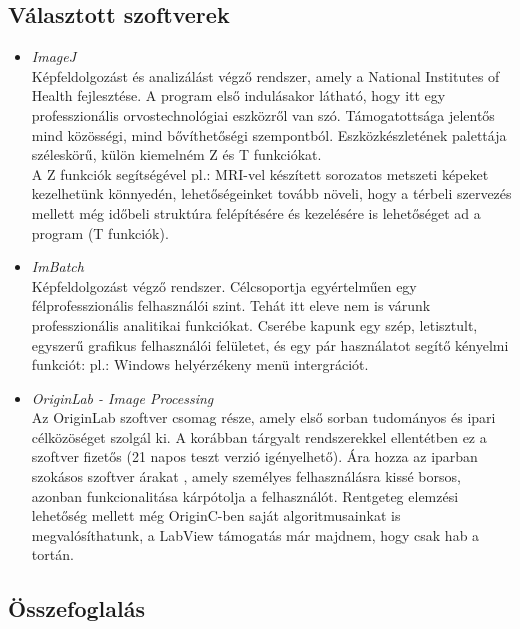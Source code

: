 \documentclass[a4paper,12pt,oneside]{report}
\begin{document}
\subsection{Választott szoftverek}
\begin{itemize}

    \item \emph{ImageJ}\cite{website:imagej}\\
    Képfeldolgozást és analizálást végző rendszer, amely a National Institutes of Health fejlesztése.
	A program első indulásakor látható, hogy itt egy professzionális orvostechnológiai eszközről van szó.
	Támogatottsága jelentős mind közösségi, mind bővíthetőségi szempontból. Eszközkészletének palettája széleskörű, külön kiemelném Z és T funkciókat.\cite{article:imagej_article}\\A Z funkciók segítségével pl.: MRI-vel készített sorozatos metszeti képeket kezelhetünk könnyedén, lehetőségeinket tovább növeli, hogy a térbeli szervezés mellett még időbeli struktúra felépítésére és kezelésére is lehetőséget ad a program (T funkciók).
    
    \item \emph{ImBatch}\cite{website:imbatch}\\
    Képfeldolgozást végző rendszer. Célcsoportja egyértelműen egy félprofesszionális felhasználói szint. Tehát itt eleve nem is várunk professzionális analitikai funkciókat. Cserébe kapunk egy szép, letisztult, egyszerű grafikus felhasználói felületet, és egy pár használatot segítő kényelmi funkciót: pl.: Windows helyérzékeny menü intergrációt.
    
    \item \emph{OriginLab - Image Processing}\cite{website:originlab}\\
	Az OriginLab szoftver csomag része, amely első sorban tudományos és ipari célközöséget szolgál ki. \cite{website:originlab_about} A korábban tárgyalt rendszerekkel ellentétben ez a szoftver fizetős (21 napos teszt verzió igényelhető). Ára hozza az iparban szokásos szoftver árakat \cite{website:originlab_usd}, amely személyes felhasználásra kissé borsos, azonban funkcionalitása kárpótolja a felhasználót. Rentgeteg elemzési lehetőség mellett még OriginC-ben saját algoritmusainkat is megvalósíthatunk, a LabView támogatás már majdnem, hogy csak hab a tortán.\\
\end{itemize}
	

\subsection{Összefoglalás}
\end{document}
